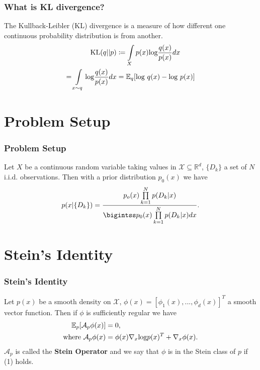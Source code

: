 \documentclass[aspectratio=169]{beamer}
\begin{document}
\begin{frame}
    \frametitle{What is KL divergence?}
    The Kullback-Leibler (KL) divergence is a measure of how different one continuous probability distribution is from another.
    \begin{align*}
        \textup{KL}(q \vert \vert p) &\coloneqq \int\displaylimits_X p(x) \textup{log}\frac{q(x)}{p(x)} dx \\
        = \int\displaylimits_{x \sim q} \textup{log}\frac{q(x)}{p(x)} dx &= \mathbb{E}_q[\textup{log} \ q(x) - \textup{log} \ p(x)]
    \end{align*}
\end{frame}


\section{Problem Setup}
\begin{frame}
    \frametitle{Problem Setup}
    Let $X$ be a continuous random variable taking values in $\mathcal{X} \subseteq \mathbb{R}^d$, $\{D_k\}$ a set of $N$ i.i.d. observations. Then with a prior distribution $p_0(x)$ we have
    \begin{align*}
        p(x \vert \{ D_k\}) = \frac{p_o(x) \prod\limits_{k=1}^{N} p(D_k \vert x)}{\bigintss p_0(x) \prod\limits_{k=1}^Np(D_k \vert x) dx} .
    \end{align*}
\end{frame}


\section{Stein's Identity}
\begin{frame}
    \frametitle{Stein's Identity}
    Let $p(x)$ be a smooth density on $\mathcal{X}$, $\phi(x) = [\phi_1(x),...,\phi_d(x)]^T$ a smooth vector function. Then if $\phi$ is sufficiently regular we have
    \begin{align}
        \mathbb{E}_p[\mathcal{A}_p \phi(x)] &= 0, \\ \textup{where} \ \mathcal{A}_p \phi(x) &= \phi(x) \nabla_x \textup{log}p(x)^T + \nabla_x \phi(x). \nonumber
    \end{align}
    $\mathcal{A}_p$ is called the \textbf{Stein Operator} and we say that $\phi$ is in the Stein class of $p$ if (1) holds.
\end{frame}
\end{document}
